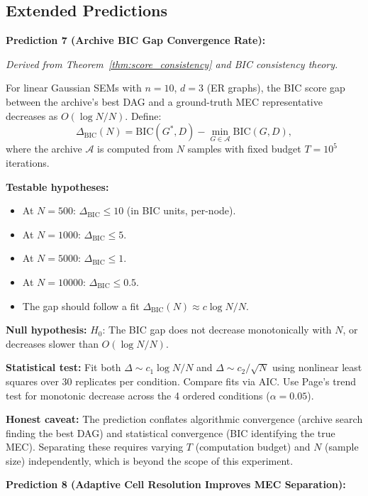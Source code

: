 \documentclass{article}
\theoremstyle{definition}
\theoremstyle{plain}
\theoremstyle{remark}
\begin{document}
\subsection*{Extended Predictions}

\textbf{Prediction 7 (Archive BIC Gap Convergence Rate):}
\label{pred:bic_gap}

\emph{Derived from Theorem~\ref{thm:score_consistency} and BIC consistency theory.}

For linear Gaussian SEMs with $n = 10$, $d = 3$ (ER graphs), the BIC score gap
between the archive's best DAG and a ground-truth MEC representative decreases as
$O(\log N / N)$. Define:
\begin{equation}
\Delta_{\mathrm{BIC}}(N) = \mathrm{BIC}(G^*, D) - \min_{G \in \mathcal{A}} \mathrm{BIC}(G, D),
\end{equation}
where the archive $\mathcal{A}$ is computed from $N$ samples with fixed budget
$T = 10^5$ iterations.

\textbf{Testable hypotheses:}
\begin{itemize}
  \item At $N = 500$: $\Delta_{\mathrm{BIC}} \leq 10$ (in BIC units, per-node).
  \item At $N = 1000$: $\Delta_{\mathrm{BIC}} \leq 5$.
  \item At $N = 5000$: $\Delta_{\mathrm{BIC}} \leq 1$.
  \item At $N = 10000$: $\Delta_{\mathrm{BIC}} \leq 0.5$.
  \item The gap should follow a fit $\Delta_{\mathrm{BIC}}(N) \approx c \log N / N$.
\end{itemize}

\textbf{Null hypothesis:} $H_0$: The BIC gap does not decrease monotonically with $N$,
or decreases slower than $O(\log N / N)$.

\textbf{Statistical test:} Fit both $\Delta \sim c_1 \log N / N$ and
$\Delta \sim c_2 / \sqrt{N}$ using nonlinear least squares over 30 replicates per
condition. Compare fits via AIC. Use Page's trend test for monotonic decrease
across the 4 ordered conditions ($\alpha = 0.05$).

\textbf{Honest caveat:} The prediction conflates algorithmic convergence (archive
search finding the best DAG) and statistical convergence (BIC identifying the true
MEC). Separating these requires varying $T$ (computation budget) and $N$ (sample
size) independently, which is beyond the scope of this experiment.

\textbf{Prediction 8 (Adaptive Cell Resolution Improves MEC Separation):}
\label{pred:acr}
\end{document}
